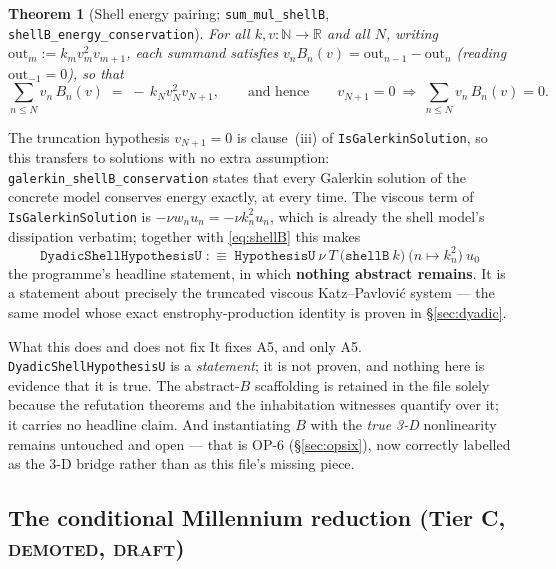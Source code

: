\documentclass[11pt,a4paper]{article}
\newcommand{\tC}{\textcolor{TierC}{\textbf{Tier C}}}
\newcommand{\N}{\mathbb{N}}
\newcommand{\R}{\mathbb{R}}
\theoremstyle{definition}
\theoremstyle{plain}
\newtheorem{theorem}{Theorem}[section]
\begin{document}
\begin{theorem}[Shell energy pairing; \texttt{sum\_mul\_shellB}, \texttt{shellB\_energy\_conservation}]
For all $k,v:\N\to\R$ and all $N$, writing $\mathrm{out}_m:=k_mv_m^2v_{m+1}$, each summand
satisfies $v_nB_n(v)=\mathrm{out}_{n-1}-\mathrm{out}_n$ (reading $\mathrm{out}_{-1}=0$), so
that
\[
\sum_{n\le N} v_n\,B_n(v)\;=\;-\,k_Nv_N^2v_{N+1},
\qquad\text{and hence}\qquad
v_{N+1}=0\ \Longrightarrow\ \sum_{n\le N} v_n\,B_n(v)=0 .
\]
\end{theorem}

The truncation hypothesis $v_{N+1}=0$ is clause~(iii) of \texttt{IsGalerkinSolution}, so this
transfers to solutions with no extra assumption: \texttt{galerkin\_shellB\_conservation}
states that every Galerkin solution of the concrete model conserves energy exactly, at every
time. The viscous term of \texttt{IsGalerkinSolution} is $-\nu w_nu_n=-\nu k_n^2u_n$, which is
already the shell model's dissipation verbatim; together with \eqref{eq:shellB} this makes
\[
\texttt{DyadicShellHypothesisU}\;:\equiv\;\texttt{HypothesisU}\ \nu\ T\
\bigl(\texttt{shellB}\ k\bigr)\ \bigl(n\mapsto k_n^2\bigr)\ u_0
\]
the programme's headline statement, in which \textbf{nothing abstract remains}. It is a
statement about precisely the truncated viscous Katz--Pavlovi\'c system --- the same model
whose exact enstrophy-production identity is proven in \S\ref{sec:dyadic}.

\begin{warnbox}{What this does and does not fix}
It fixes A5, and only A5. \texttt{DyadicShellHypothesisU} is a \emph{statement}; it is not
proven, and nothing here is evidence that it is true. The abstract-$B$ scaffolding is retained
in the file solely because the refutation theorems and the inhabitation witnesses quantify over
it; it carries no headline claim. And instantiating $B$ with the \emph{true 3-D} nonlinearity
remains untouched and open --- that is OP-6 (\S\ref{sec:opsix}), now correctly labelled as the
3-D bridge rather than as this file's missing piece.
\end{warnbox}

\subsection{The conditional Millennium reduction (\tC{}, \textsc{demoted}, \textsc{draft})}
\end{document}
